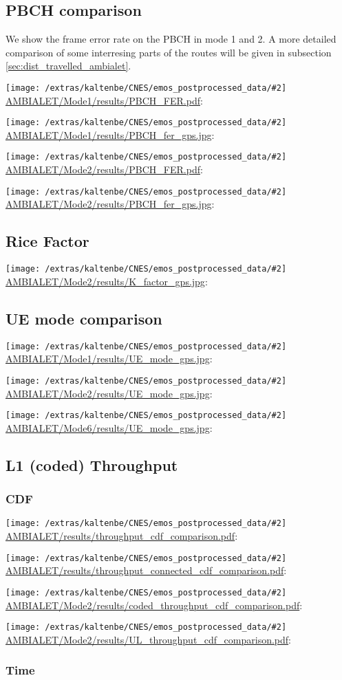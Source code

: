 \documentclass[a4paper,10pt]{article}
\newcommand{\printfile}[2][]{
 \begin{minipage}{8cm}
  \centering
  \texttt{[image: /extras/kaltenbe/CNES/emos\_postprocessed\_data/\#2]}
  \url{#2}: #1

 \end{minipage}
}
\begin{document}
\subsection{PBCH comparison}
We show the frame error rate on the PBCH in mode 1 and 2. A more detailed comparison of some interresing parts of the routes will be given in subsection \ref{sec:dist_travelled_ambialet}.

\printfile{AMBIALET/Mode1/results/PBCH_FER.pdf}
\printfile{AMBIALET/Mode1/results/PBCH_fer_gps.jpg}

\printfile{AMBIALET/Mode2/results/PBCH_FER.pdf}
\printfile{AMBIALET/Mode2/results/PBCH_fer_gps.jpg}

\subsection{Rice Factor}

\printfile{AMBIALET/Mode2/results/K_factor_gps.jpg}

\subsection{UE mode comparison}

\printfile{AMBIALET/Mode1/results/UE_mode_gps.jpg}
\printfile{AMBIALET/Mode2/results/UE_mode_gps.jpg}

\printfile{AMBIALET/Mode6/results/UE_mode_gps.jpg}

\subsection{L1 (coded) Throughput}


\subsubsection{CDF}


\printfile{AMBIALET/results/throughput_cdf_comparison.pdf}
\printfile{AMBIALET/results/throughput_connected_cdf_comparison.pdf}

\printfile{AMBIALET/Mode2/results/coded_throughput_cdf_comparison.pdf}
\printfile{AMBIALET/Mode2/results/UL_throughput_cdf_comparison.pdf}

\subsubsection{Time}
\end{document}
